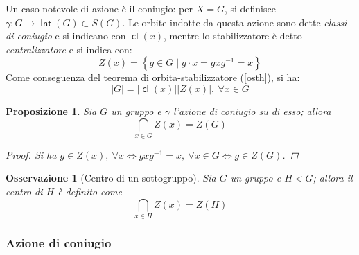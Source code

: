 \documentclass[11pt]{scrartcl}
\theoremstyle{style1}
\newtheorem{osservazione}{Osservazione}[section]
\newtheorem{prop}{Proposizione}[section]
\numberwithin{equation}{subsection}
\renewcommand{\operatorname}[1]{\mathop{\mathrm{\textsf{#1}}}}
\begin{document}
\noindent Un caso notevole di azione \`e il coniugio: per $X=G$, si definisce $\gamma : G \to \operatorname{Int} (G) \subset S(G)$.
Le orbite indotte da questa azione sono dette \textit{classi di coniugio} e si indicano con $\operatorname{cl} (x)$, mentre lo stabilizzatore \`e detto \textit{centralizzatore} e si indica con:
\begin{equation}
	Z(x) = \left\{ g \in G  \mid g \cdot x = gxg^{-1} = x \right\} 
\end{equation}
Come conseguenza del teorema di orbita-stabilizzatore (\ref{osth}), si ha:
\begin{equation}
	\lvert G \rvert  = \lvert \operatorname{cl} (x)  \rvert  \lvert Z(x) \rvert , \ \forall x \in G
\end{equation}
\begin{prop}
	Sia $G$ un gruppo e $\gamma$ l'azione di coniugio su di esso; allora
	\[
	\bigcap_{x \in G} Z(x) = Z(G)
	\] 
	\begin{proof}
		Si ha $g \in Z(x), \ \forall x \iff gxg^{-1} =x , \ \forall x \in G \iff g \in Z(G)$.
	\end{proof}
\end{prop}
\begin{osservazione}
	[Centro di un sottogruppo]
	Sia $G$ un gruppo e $H < G$; allora il centro di $H$ \`e definito come 
	\[
	\bigcap_{x \in H}  Z(x) = Z(H)
	\] 
\end{osservazione}

\subsubsection{Azione di coniugio}
\end{document}
